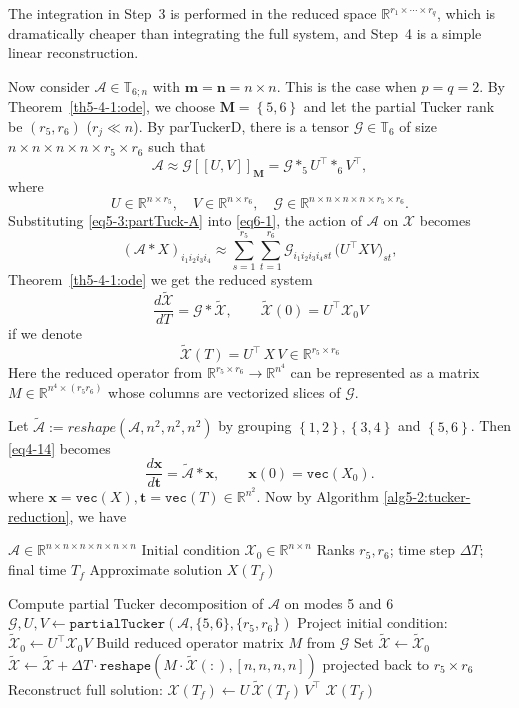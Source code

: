 \documentclass[11pt, oneside]{article}  %
\newcommand{\dsb}[1]{[\![#1]\!]}
\newcommand{\set}[1]{\left\{#1\right\}}
\newcommand{\vecc}{\texttt{vec}}
\newcommand{\RR}{\mathbb{R}}
\newcommand{\TT}{\mathbb{T}}
\newcommand{\A}{\mathcal{A}}
\newcommand{\tA}{\tilde{\A}}
\newcommand{\caG}{\mathcal{G}}
\newcommand{\caM}{\mathbf{M}}
\newcommand{\X}{\mathcal{X}}
\newcommand{\ttX}{\tilde{\X}}
\newcommand{\bfm}{\textbf{m}}
\newcommand{\bfn}{\textbf{n}}
\newcommand{\bft}{\textbf{t}}
\newcommand{\bx}{\textbf{x}}
\newcommand{\beq}{\begin{equation}}
\newcommand{\eeq}{\end{equation}}
\begin{document}
The integration in Step~3 is performed in the reduced space $\RR^{r_1\times\cdots\times r_q}$, which is dramatically cheaper than integrating the full system, and Step~4 is a simple linear reconstruction. 

Now consider $\A\in\TT_{6;n}$ with $\bfm=\bfn=n\times n$. This is the case when $p=q=2$. By Theorem~\ref{th5-4-1:ode}, we choose 
$\caM=\set{5,6}$ and let the partial Tucker rank be $(r_{5}, r_{6})$ ($r_j\ll n$).  By parTuckerD, there is a tensor $\caG\in\TT_{6}$ of size 
$n\times n\times n\times n\times r_{5}\times r_{6}$ such that 
\beq\label{eq5-3:partTuck-A}
\A\approx \caG \dsb{U, V}_{\caM} = \caG\ast_5 U^{\top}\ast_6 V^{\top},
\eeq
where
\[
U\in \RR^{n \times r_5}, \quad V\in \RR^{n \times r_6}, \quad  \caG\in \RR^{n\times n\times n \times n \times r_5 \times r_6}.
\]
Substituting \eqref{eq5-3:partTuck-A} into \eqref{eq6-1}, the action of $\A$ on $\X$ becomes
\[
(\A \ast X)_{i_1 i_2 i_3 i_4}
\approx \sum_{s=1}^{r_5} \sum_{t=1}^{r_6}
\caG_{i_1 i_2 i_3 i_4 s t} \, \bigl( U^{\top}XV \bigr)_{s t},
\]
Theorem~\ref{th5-4-1:ode}
we get the reduced system
\beq\label{eq6-4:reduced-ode}
\frac{d\ttX}{dT} = \caG \ast \ttX, \qquad \ttX(0) = U^\top \X_0 V
\eeq
if we denote 
\beq\label{eq6-5:reduced-state}
\ttX(T) = U^{\top}\,X\,V\in\RR^{r_5 \times r_6}
\eeq
Here the reduced operator from $\RR^{r_5 \times r_6} \to \RR^{n^4}$ can be represented as a matrix $M\in \RR^{n^4 \times (r_5 r_6)}$ 
whose columns are vectorized slices of $\caG$.  

Let $\tA:=reshape(\A, n^{2},n^{2},n^{2})$ by grouping $\set{1,2}, \set{3,4}$ and $\set{5,6}$. Then \eqref{eq4-14} becomes
\beq\label{eq6-2}
\frac{d\bx}{d\bft} = \tA\ast \bx, \qquad \bx(0) = \vecc(X_0).
\eeq
where $\bx= \vecc(X), \bft = \vecc(T)\in\RR^{n^2}$.  Now by Algorithm \ref{alg5-2:tucker-reduction}, we have

\begin{algorithm}[H]
\caption{ODE Solution via Partial Tucker Decomposition}
\label{alg5-3:ode-tucker}

\begin{algorithmic}[1]
\Require $\A \in \RR^{n \times n \times n \times n \times n \times n}$
\Require Initial condition $\X_0 \in \RR^{n \times n}$
\Require Ranks $r_5, r_6$; time step $\Delta T$; final time $T_f$
\Ensure Approximate solution $X(T_f)$

\State Compute partial Tucker decomposition of $\A$ on modes 5 and 6
\State \hspace{0.5cm} $\caG, U, V\gets \texttt{partialTucker}(\A, \{5,6\}, \{r_5,r_6\})$
\State Project initial condition: $\ttX_0 \gets U^\top \X_0 V$
\State Build reduced operator matrix $M$ from $\caG$
\State Set $\ttX \gets \ttX_0$
    \State $\ttX \gets \ttX + \Delta T \cdot \texttt{reshape}(M \cdot \ttX(:), [n,n,n,n])$
    \State \hspace{0.5cm} projected back to $r_5 \times r_6$
\EndFor
\State Reconstruct full solution: $\X(T_f) \gets U\, \ttX(T_f) \, V^\top$
\State \Return $\X(T_f)$
\end{algorithmic}
\end{algorithm}
\end{document}
